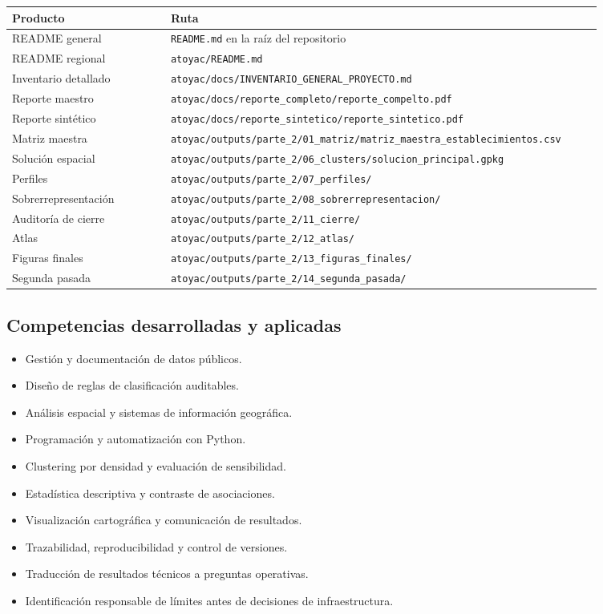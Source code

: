 \documentclass[
  spanish,
]{article}
\newcounter{none} %
\providecommand{\tightlist}{%
  \setlength{\itemsep}{0pt}\setlength{\parskip}{0pt}}
\begin{document}
{\def\LTcaptype{none} %
\begin{longtable}[]{@{}p{0.25\linewidth}p{0.68\linewidth}@{}}
\toprule\noalign{}
Producto & Ruta \\
\midrule\noalign{}
\endhead
\bottomrule\noalign{}
\endlastfoot
README general & \texttt{README.md} en la raíz del repositorio \\
README regional & \texttt{atoyac/README.md} \\
Inventario detallado &
\texttt{atoyac/docs/INVENTARIO\_GENERAL\_PROYECTO.md} \\
Reporte maestro &
\texttt{atoyac/docs/reporte\_completo/reporte\_compelto.pdf} \\
Reporte sintético &
\texttt{atoyac/docs/reporte\_sintetico/reporte\_sintetico.pdf} \\
Matriz maestra &
\texttt{atoyac/outputs/parte\_2/01\_matriz/matriz\_maestra\_establecimientos.csv} \\
Solución espacial &
\texttt{atoyac/outputs/parte\_2/06\_clusters/solucion\_principal.gpkg} \\
Perfiles & \texttt{atoyac/outputs/parte\_2/07\_perfiles/} \\
Sobrerrepresentación &
\texttt{atoyac/outputs/parte\_2/08\_sobrerrepresentacion/} \\
Auditoría de cierre & \texttt{atoyac/outputs/parte\_2/11\_cierre/} \\
Atlas & \texttt{atoyac/outputs/parte\_2/12\_atlas/} \\
Figuras finales &
\texttt{atoyac/outputs/parte\_2/13\_figuras\_finales/} \\
Segunda pasada &
\texttt{atoyac/outputs/parte\_2/14\_segunda\_pasada/} \\
\end{longtable}
}

\subsection{Competencias desarrolladas y
aplicadas}\label{competencias-desarrolladas-y-aplicadas}

\begin{itemize}
\tightlist
\item
  Gestión y documentación de datos públicos.
\item
  Diseño de reglas de clasificación auditables.
\item
  Análisis espacial y sistemas de información geográfica.
\item
  Programación y automatización con Python.
\item
  Clustering por densidad y evaluación de sensibilidad.
\item
  Estadística descriptiva y contraste de asociaciones.
\item
  Visualización cartográfica y comunicación de resultados.
\item
  Trazabilidad, reproducibilidad y control de versiones.
\item
  Traducción de resultados técnicos a preguntas operativas.
\item
  Identificación responsable de límites antes de decisiones de
  infraestructura.
\end{itemize}
\end{document}
